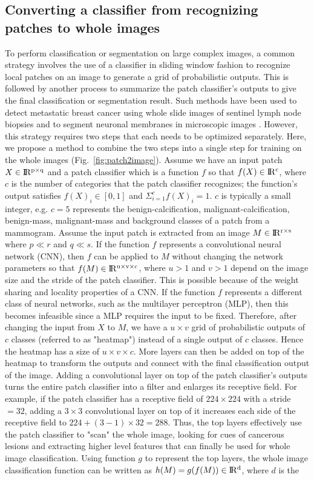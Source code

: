 \documentclass[12pt,letterpaper]{article}
\begin{document}
\subsection{Converting a classifier from recognizing patches to whole images}
To perform classification or segmentation on large complex images, a common strategy involves the use of a classifier in sliding window fashion to recognize local patches on an image to generate a grid of probabilistic outputs. This is followed by another process to summarize the patch classifier's outputs to give the final classification or segmentation result. Such methods have been used to detect metastatic breast cancer using whole slide images of sentinel lymph node biopsies \cite{wang_deep_2016} and to segment neuronal membranes in microscopic images \cite{ciresan_deep_2012}. However, this strategy requires two steps that each needs to be optimized separately. Here, we propose a method to combine the two steps into a single step for training on the whole images (Fig.~\ref{fig:patch2image}). Assume we have an input patch $X\in \rm I\!R^{p\times q}$ and a patch classifier which is a function $f$ so that $f(X)\in \rm I\!R^{c}$, where $c$ is the number of categories that the patch classifier recognizes; the function's output satisfies $f(X)_{i} \in [0, 1]$ and $\Sigma_{i=1}^{c}f(X)_{i}=1$. $c$ is typically a small integer, e.g. $c=5$ represents the benign-calcification, malignant-calcification, benign-mass, malignant-mass and background classes of a patch from a mammogram. Assume the input patch is extracted from an image $M\in \rm I\!R^{r\times s}$ where $p \ll r$ and $q \ll s$. If the function $f$ represents a convolutional neural network (CNN), then $f$ can be applied to $M$ without changing the network parameters so that $f(M)\in \rm I\!R^{u \times v \times c}$, where $u > 1$ and $v > 1$ depend on the image size and the stride of the patch classifier. This is possible because of the weight sharing and locality properties of a CNN. If the function $f$ represents a different class of neural networks, such as the multilayer perceptron (MLP), then this becomes infeasible since a MLP requires the input to be fixed. Therefore, after changing the input from $X$ to $M$, we have a $u \times v$ grid of probabilistic outputs of $c$ classes (referred to as "heatmap") instead of a single output of $c$ classes. Hence the heatmap has a size of $u \times v \times c$. More layers can then be added on top of the heatmap to transform the outputs and connect with the final classification output of the image. Adding a convolutional layer on top of the patch classifier's outputs turns the entire patch classifier into a filter and enlarges its receptive field. For example, if the patch classifier has a receptive field of $224 \times 224$ with a stride$=32$, adding a $3 \times 3$ convolutional layer on top of it increases each side of the receptive field to $224+(3-1) \times 32=288$. Thus, the top layers effectively use the patch classifier to "scan" the whole image, looking for cues of cancerous lesions and extracting higher level features that can finally be used for whole image classification. Using function $g$ to represent the top layers, the whole image classification function can be written as $h(M) = g(f(M)) \in \rm I\!R^{d}$, where $d$ is the 
\end{document}
